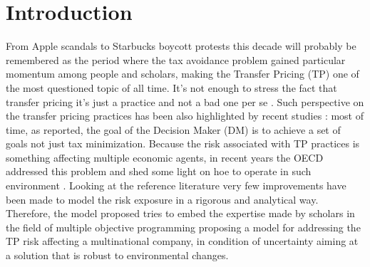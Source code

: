 \documentclass[conference,final,a4paper]{IEEEtran}
\begin{document}
\maketitle

\IEEEpeerreviewmaketitle


\hypertarget{introduction}{%
\section{Introduction}\label{introduction}}

From Apple scandals \cite{leswing18} to Starbucks boycott protests
\cite{campbell16} this decade will probably be remembered as
the period where the tax avoidance problem gained particular momentum
among people and scholars, making the Transfer Pricing (TP) one of the most questioned topic of all time. It's not enough to stress the fact that transfer pricing it's just a practice and not a bad one per se \cite{oecd15}. Such perspective on the transfer pricing practices has been also highlighted by recent studies \cite{klassen16}: most of time, as reported, the goal of the Decision Maker (DM) is to achieve a set of goals not just tax minimization. Because the risk associated with TP practices is something affecting multiple economic agents, in recent years the OECD addressed this problem and shed some light on hoe to operate in such environment \cite{oecd12}. Looking at the reference literature very few improvements have been made to model the risk exposure in a rigorous and analytical way. Therefore, the model proposed tries to embed the expertise made by scholars in the field of multiple objective programming proposing a model for addressing the TP risk affecting a multinational company, in condition of uncertainty aiming at a solution that is robust \cite{bertsimas03} to environmental changes.
\end{document}
